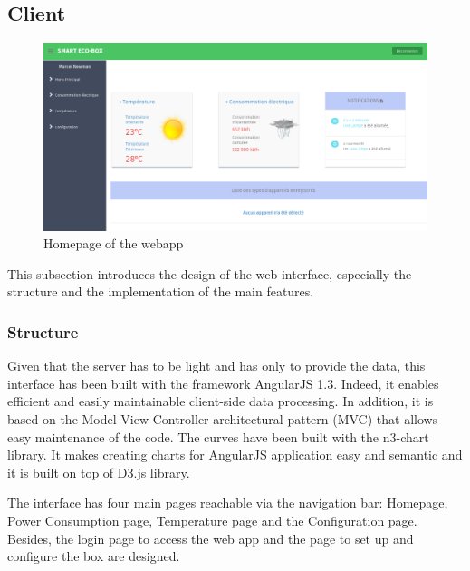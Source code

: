 \subsection{Client} %
\begin{figure}[H]
\centering
\includegraphics[scale=0.4]{figures/Accueil.pdf}
\caption{Homepage of the webapp}
\label{fig:Accueil}
\end{figure}
This subsection introduces the design of the web interface, especially the structure and the implementation of the main features.

\subsubsection{Structure}
    Given that the server has to be light and has only to provide the data, this interface has been built with the framework AngularJS 1.3. Indeed, it enables efficient and easily maintainable client-side data processing. In addition, it is based on the Model-View-Controller architectural pattern (MVC) that allows easy maintenance of the code. The curves have been built with the n3-chart library. It makes creating charts for AngularJS application easy and semantic and it is built on top of D3.js library.
    
    The interface has four main pages reachable via the navigation bar: Homepage, Power Consumption page, Temperature page and the Configuration page. Besides, the login page to access the web app and the page to set up and configure the box are designed.
     

